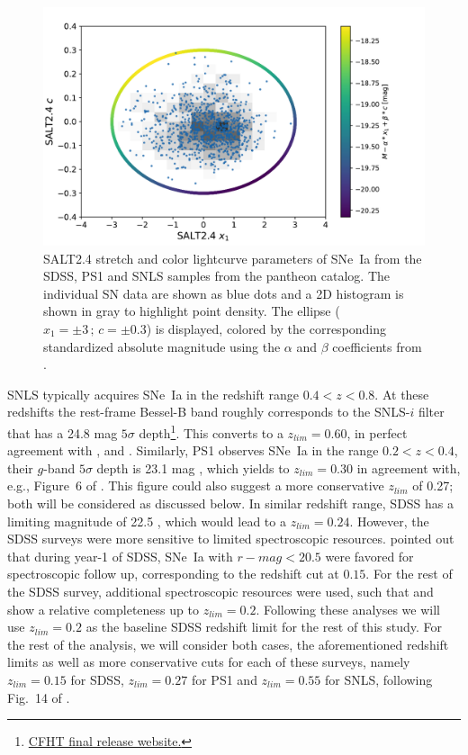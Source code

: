 \documentclass[]{aa} %
\newcommand{\nn}[1]{{\textcolor[rgb]{1, 0.27, 0}{#1}}}
\begin{document}
\begin{figure}
    \centering
    \includegraphics[width=0.95\linewidth]{Article_figures/zmax_maglim_all.pdf}
    \caption{SALT2.4 stretch and color lightcurve parameters of SNe~Ia from the
        SDSS, PS1 and SNLS samples from the pantheon catalog. The individual SN
        data are shown as blue dots and a 2D histogram is shown in gray to
        highlight point density.  The ellipse ($x_1=\pm3\,\mathrm{;}\,c=\pm0.3$)
    is displayed, colored by the corresponding standardized absolute magnitude
using the $\alpha$ and $\beta$ coefficients from \citep{scolnic2018a}.}
    \label{fig:maglim}
\end{figure}

SNLS typically acquires SNe~Ia in the redshift range $0.4<z<0.8$. At these
redshifts the rest-frame Bessel-B band roughly corresponds to the SNLS-$i$
filter that has a 24.8 mag $5\sigma$
depth\footnote{\href{https://www.cfht.hawaii.edu/Science/CFHTLS/cfhtlsfinalreleaseexecsummary.html}{CFHT
final release website.}}. This converts to a $z_{lim}=0.60$, in perfect
agreement with \cite{neill2006}, \cite{perrett2010} and \cite{bazin2011}.
Similarly, PS1 observes SNe~Ia in the range $0.2<z<0.4$, their $g$-band
$5\sigma$ depth is 23.1 mag \citep{rest2014}, which yields to $z_{lim}=0.30$ in
agreement with, e.g., Figure~6 of \cite{scolnic2018a}. This figure could also
suggest a more conservative $z_{lim}$ of 0.27; both will be considered as
discussed below.  In similar redshift range, SDSS has a limiting magnitude of
22.5 \citep{dilday2008,sako2008}, which would lead to a $z_{lim}=0.24$. However,
the SDSS surveys were more sensitive to limited spectroscopic resources.
\cite{kessler2009} \nn{pointed out} that during year-1 of SDSS, SNe~Ia with
$r-mag<20.5$ were favored for spectroscopic follow up, corresponding to the
redshift cut at $0.15$. For the rest of the SDSS survey, additional
spectroscopic resources were used, such that \cite{kessler2009} and
\cite{dilday2008} show a relative completeness up to $z_{lim}=0.2$.  Following
these analyses we will use $z_{lim}=0.2$ as the baseline SDSS redshift limit for
the rest of \nn{this study}.  For the rest of the analysis, we will consider
both cases, the \nn{aforementioned} redshift limits as well as more conservative
cuts for each of these surveys, namely $z_{lim}=0.15$ for SDSS, $z_{lim}=0.27$
for PS1 and $z_{lim}=0.55$ for SNLS, following Fig.~14 of \citealt{perrett2010}. 
\end{document}
